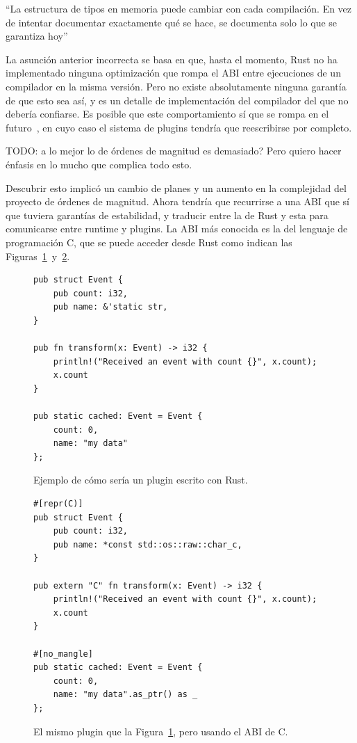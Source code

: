 ``La estructura de tipos en memoria puede cambiar con cada compilación. En vez
de intentar documentar exactamente qué se hace, se documenta solo lo que se
garantiza hoy''~\cite[Type Layout]{rustref}

La asunción anterior incorrecta se basa en que, hasta el momento, Rust no ha
implementado ninguna optimización que rompa el ABI entre ejecuciones de un
compilador en la misma versión. Pero no existe absolutamente ninguna garantía de
que esto sea así, y es un detalle de implementación del compilador del que no
debería confiarse. Es posible que este comportamiento sí que se rompa en el
futuro~\cite{randomizelayout}, en cuyo caso el sistema de plugins tendría que
reescribirse por completo.

TODO: a lo mejor lo de órdenes de magnitud es demasiado? Pero quiero hacer
énfasis en lo mucho que complica todo esto.

Descubrir esto implicó un cambio de planes y un aumento en la complejidad del
proyecto de órdenes de magnitud. Ahora tendría que recurrirse a una ABI que sí
que tuviera garantías de estabilidad, y traducir entre la de Rust y esta para
comunicarse entre runtime y plugins. La ABI más conocida es la del lenguaje de
programación C, que se puede acceder desde Rust como indican las
Figuras~\ref{fig:rustpure}~y~\ref{fig:rustffi}.

\begin{figure}
    \centering
    \begin{verbatim}
pub struct Event {
    pub count: i32,
    pub name: &'static str,
}

pub fn transform(x: Event) -> i32 {
    println!("Received an event with count {}", x.count);
    x.count
}

pub static cached: Event = Event {
    count: 0,
    name: "my data"
};
    \end{verbatim}

    \caption{Ejemplo de cómo sería un plugin escrito con Rust.}%
    \label{fig:rustpure}
\end{figure}

\begin{figure}
    \centering
    \begin{verbatim}
#[repr(C)]
pub struct Event {
    pub count: i32,
    pub name: *const std::os::raw::char_c,
}

pub extern "C" fn transform(x: Event) -> i32 {
    println!("Received an event with count {}", x.count);
    x.count
}

#[no_mangle]
pub static cached: Event = Event {
    count: 0,
    name: "my data".as_ptr() as _
};
    \end{verbatim}

    \caption{El mismo plugin que la Figura~\ref{fig:rustpure}, pero usando el
    ABI de C.}%
    \label{fig:rustffi}
\end{figure}

